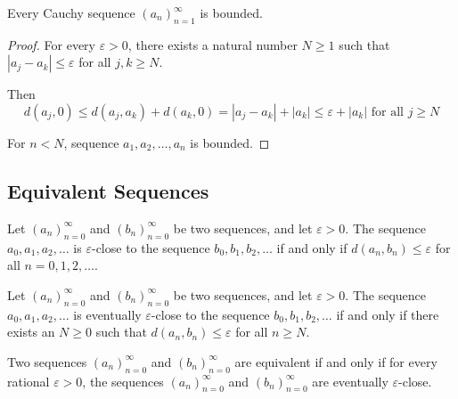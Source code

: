 \documentclass{blog}
\begin{document}
\begin{lemma}
  Every Cauchy sequence $(a_{n})_{n = 1}^{\infty}$ is bounded.
\end{lemma}

\begin{proof}
  For every $\varepsilon > 0$, there exists a natural number $N \geq 1$ such that
  $|a_{j} - a_{k}| \leq \varepsilon$ for all $j, k \geq N$.

  Then
  \begin{equation*}
    d(a_{j}, 0) \leq d(a_{j}, a_{k}) + d(a_{k}, 0) = |a_{j} - a_{k}| + |a_{k}| \leq \varepsilon + |a_{k}|
    \text{ for all } j \geq N
  \end{equation*}

  For $n < N$, sequence $a_{1}, a_{2}, \dots, a_{n}$ is bounded.
\end{proof}

\subsection{Equivalent Sequences}
\begin{definition}
  Let $(a_{n})_{n = 0}^{\infty}$ and $(b_{n})_{n = 0}^{\infty}$ be two sequences,
  and let $\varepsilon > 0$.
  The sequence $a_{0}, a_{1}, a_{2}, \dots$ is
  $\varepsilon$-close to the sequence $b_{0}, b_{1}, b_{2}, \dots$
  if and only if $d(a_{n}, b_{n}) \leq \varepsilon$ for all $n = 0, 1, 2, \dots$.
\end{definition}

\begin{definition}
  Let $(a_{n})_{n = 0}^{\infty}$ and $(b_{n})_{n = 0}^{\infty}$ be two sequences,
  and let $\varepsilon > 0$.
  The sequence $a_{0}, a_{1}, a_{2}, \dots$ is
  eventually $\varepsilon$-close to the sequence $b_{0}, b_{1}, b_{2}, \dots$
  if and only if there exists an $N \geq 0$ such that
  $d(a_{n}, b_{n}) \leq \varepsilon$ for all $n \geq N$.
\end{definition}

\begin{definition}
  Two sequences $(a_{n})_{n = 0}^{\infty}$ and $(b_{n})_{n = 0}^{\infty}$ are equivalent
  if and only if for every rational $\varepsilon > 0$,
  the sequences $(a_{n})_{n = 0}^{\infty}$ and $(b_{n})_{n = 0}^{\infty}$ are eventually $\varepsilon$-close.
\end{definition}
\end{document}
